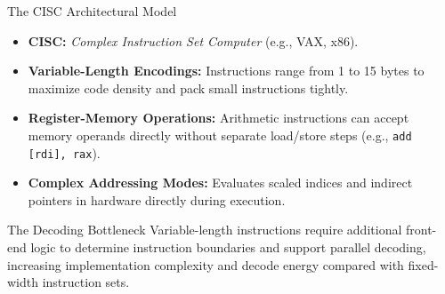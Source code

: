 \documentclass[aspectratio=169,11pt,t]{beamer}
\newcommand{\key}[1]{\textbf{#1}}
\newcommand{\code}[1]{\texttt{#1}}
\begin{document}
\begin{frame}{The CISC Architectural Model}
\vfill
\begin{itemize}\setlength{\itemsep}{8pt}
  \item \key{CISC:} \emph{Complex Instruction Set Computer} (e.g., VAX, x86).
  \item \key{Variable-Length Encodings:} Instructions range from 1 to 15 bytes to maximize code density and pack small instructions tightly.
  \item \key{Register-Memory Operations:} Arithmetic instructions can accept memory operands directly without separate load/store steps (e.g., \code{add [rdi], rax}).
  \item \key{Complex Addressing Modes:} Evaluates scaled indices and indirect pointers in hardware directly during execution.
\end{itemize}

\vfill
\begin{block}{The Decoding Bottleneck}
\small Variable-length instructions require additional front-end logic to determine instruction boundaries and support parallel decoding, increasing implementation complexity and decode energy compared with fixed-width instruction sets.
\end{block}
\vfill
\end{frame}











\end{document}

